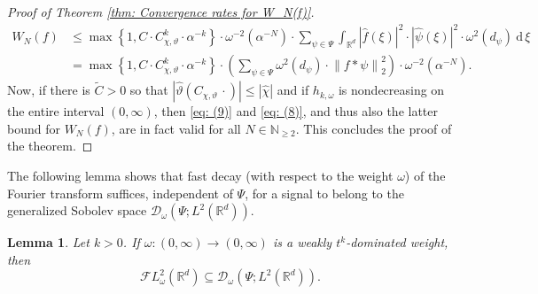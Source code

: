 \documentclass[11pt]{amsart}
\newcommand{\R}{{\mathbb{R}}}
\newcommand{\N}{\mathbb{N}}
\newcommand{\dxi}{\:\mathrm{d}\,\xi\:}
\newcommand{\norm}[1]{\ensuremath{\left\lVert\text{}#1\text{}\right\rVert}}
\newtheorem{lemma}[theorem]{Lemma}
\newenvironment{proof sketch} {\textit{Proof sketch.}}{}
\begin{document}
\begin{proof}[Proof of Theorem \ref{thm: Convergence rates for W_N(f)}]
    \begin{align*}
      W_{N}(f) &\leq \max\left\{1,C \cdot C_{\chi,\vartheta}^k \cdot \alpha^{-k}\right\} \cdot \omega^{-2}(\alpha^{-N}) \cdot \sum_{\psi \in \Psi} \int_{\R^d} |\widehat{f}(\xi)|^2 \cdot |\widehat{\psi}(\xi)|^2 \cdot \omega^{2}(d_\psi) \dxi \\
      &= \max\left\{1,C \cdot C_{\chi,\vartheta}^k \cdot \alpha^{-k}\right\} \cdot \left(\sum_{\psi \in \Psi} \omega^{2}(d_\psi) \cdot \norm{f*\psi}_2^2\right) \cdot \omega^{-2}(\alpha^{-N}).
    \end{align*}
    Now, if there is $\widetilde{C}>0$ so that $|\widehat{\vartheta}(C_{\chi,\vartheta} \, \cdot)| \leq |\widehat{\chi}|$ and if $h_{k,\omega}$ is nondecreasing on the entire interval $(0,\infty)$, then \eqref{eq: (9)} and \eqref{eq: (8)}, and thus also the latter bound for $W_N(f)$, are in fact valid for all $N \in \N_{\geq 2}$.
    This concludes the proof of the theorem.
  \end{proof}
  
  The following lemma shows that fast decay (with respect to the weight $\omega$) of the Fourier transform suffices, independent of $\Psi$, for a signal to belong to the generalized Sobolev space $\mathcal{D}_\omega(\Psi;L^2(\R^d))$.
  
  \begin{lemma}\label{lem: Inclusion relation between Fourier-weighted L2 space and decomp space}
    Let $k>0$. If $\omega:(0,\infty)\to (0,\infty)$ is a weakly $t^k$-dominated weight, then 
    \[\mathcal{F}L_\omega^2(\R^d) \subseteq \mathcal{D}_\omega(\Psi;L^2(\R^d)).\] 
  \end{lemma}
  
\end{document}
